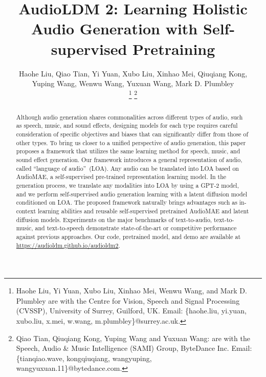 \documentclass[lettersize,journal]{IEEEtran}
\begin{document}
\newcommand{\vModelName}{\textit{AudioLDM 2}}

\title{AudioLDM 2: Learning Holistic Audio Generation with Self-supervised Pretraining}

\author{Haohe Liu, Qiao Tian, Yi Yuan, Xubo Liu, Xinhao Mei, Qiuqiang Kong, \\
Yuping Wang, Wenwu Wang, Yuxuan Wang, Mark D. Plumbley\\ 
\thanks{Haohe Liu, Yi Yuan, Xubo Liu, Xinhao Mei, Wenwu Wang, and Mark D. Plumbley are with the Centre for Vision, Speech and Signal Processing (CVSSP), University of Surrey, Guilford, UK. Email: \{haohe.liu, yi.yuan, xubo.liu, x.mei, w.wang, m.plumbley\}@surrey.ac.uk.}
\thanks{Qiao Tian, Qiuqiang Kong, Yuping Wang and Yuxuan Wang: are with the Speech, Audio \& Music Intelligence (SAMI) Group, ByteDance Inc. Email: \{tianqiao.wave, kongqiuqiang, wangyuping, wangyuxuan.11\}@bytedance.com.}}

\maketitle

\begin{abstract}
Although audio generation shares commonalities across different types of audio, such as speech, music, and sound effects, designing models for each type requires careful consideration of specific objectives and biases that can significantly differ from those of other types. To bring us closer to a unified perspective of audio generation, this paper proposes a framework that utilizes the same learning method for speech, music, and sound effect generation. Our framework introduces a general representation of audio, called ``language of audio''~(LOA). Any audio can be translated into LOA based on AudioMAE, a self-supervised pre-trained representation learning model. In the generation process, we translate any modalities into LOA by using a GPT-2 model, and we perform self-supervised audio generation learning with a latent diffusion model conditioned on LOA. The proposed framework naturally brings advantages such as in-context learning abilities and reusable self-supervised pretrained AudioMAE and latent diffusion models. Experiments on the major benchmarks of text-to-audio, text-to-music, and text-to-speech demonstrate state-of-the-art or competitive performance against previous approaches. Our code, pretrained model, and demo are available at \url{https://audioldm.github.io/audioldm2}.
\end{abstract}
\end{document}
